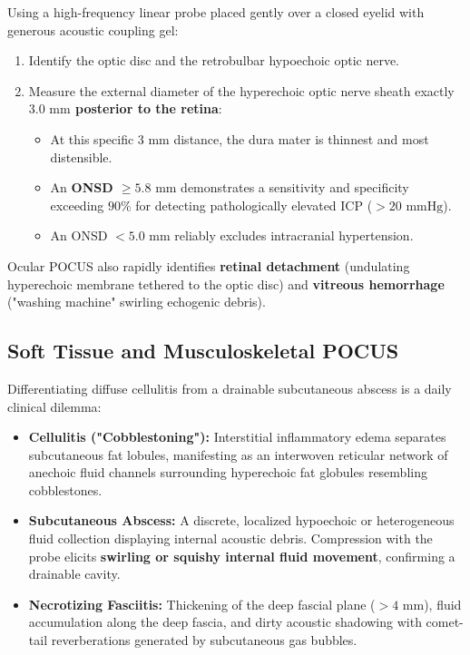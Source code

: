 \documentclass[11pt,a4paper]{article}
\begin{document}
\begin{physicsbox}
Using a high-frequency linear probe placed gently over a closed eyelid with generous acoustic coupling gel:
\begin{enumerate}[leftmargin=1.5em]
    \item Identify the optic disc and the retrobulbar hypoechoic optic nerve.
    \item Measure the external diameter of the hyperechoic optic nerve sheath exactly \textbf{$3.0\text{ mm}$ posterior to the retina}:
    \begin{itemize}
        \item At this specific $3\text{ mm}$ distance, the dura mater is thinnest and most distensible.
        \item An \textbf{ONSD $\ge 5.8\text{ mm}$} demonstrates a sensitivity and specificity exceeding $90\%$ for detecting pathologically elevated ICP ($> 20\text{ mmHg}$).
        \item An ONSD $< 5.0\text{ mm}$ reliably excludes intracranial hypertension.
    \end{itemize}
\end{enumerate}
Ocular POCUS also rapidly identifies \textbf{retinal detachment} (undulating hyperechoic membrane tethered to the optic disc) and \textbf{vitreous hemorrhage} ("washing machine" swirling echogenic debris).
\end{physicsbox}

\subsection{Soft Tissue and Musculoskeletal POCUS}
Differentiating diffuse cellulitis from a drainable subcutaneous abscess is a daily clinical dilemma:
\begin{itemize}[leftmargin=2em]
    \item \textbf{Cellulitis ("Cobblestoning"):} Interstitial inflammatory edema separates subcutaneous fat lobules, manifesting as an interwoven reticular network of anechoic fluid channels surrounding hyperechoic fat globules resembling cobblestones.
    \item \textbf{Subcutaneous Abscess:} A discrete, localized hypoechoic or heterogeneous fluid collection displaying internal acoustic debris. Compression with the probe elicits \textbf{swirling or squishy internal fluid movement}, confirming a drainable cavity.
    \item \textbf{Necrotizing Fasciitis:} Thickening of the deep fascial plane ($> 4\text{ mm}$), fluid accumulation along the deep fascia, and dirty acoustic shadowing with comet-tail reverberations generated by subcutaneous gas bubbles.
\end{itemize}
\end{document}
